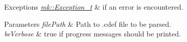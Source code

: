 \begin{DoxyExceptions}{Exceptions}
{\em \hyperlink{classmk_1_1_exception__t}{mk\+::\+Exception\+\_\+t}} & if an error is encountered. \\
\hline
\end{DoxyExceptions}

\begin{DoxyParams}{Parameters}
{\em file\+Path} & Path to .cdef file to be parsed. \\
\hline
{\em be\+Verbose} & true if progress messages should be printed. \\
\hline
\end{DoxyParams}
